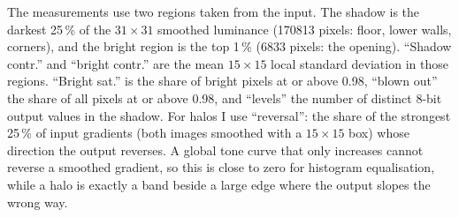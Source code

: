 The measurements use two regions taken from the input. The shadow is the
darkest 25\,\% of the $31\times31$ smoothed luminance (170813 pixels: floor,
lower walls, corners), and the bright region is the top 1\,\% (6833 pixels: the
opening). ``Shadow contr.'' and ``bright contr.'' are the mean $15\times15$
local standard deviation in those regions. ``Bright sat.'' is the share of bright
pixels at or above 0.98, ``blown out'' the share of all pixels at or above 0.98,
and ``levels'' the number of distinct 8-bit output values in the shadow. For
halos I use ``reversal'': the share of the strongest 25\,\% of input gradients
(both images smoothed with a $15\times15$ box) whose direction the output
reverses. A global tone curve that only increases cannot reverse a smoothed
gradient, so this is close to zero for histogram equalisation, while a halo is
exactly a band beside a large edge where the output slopes the wrong way.

